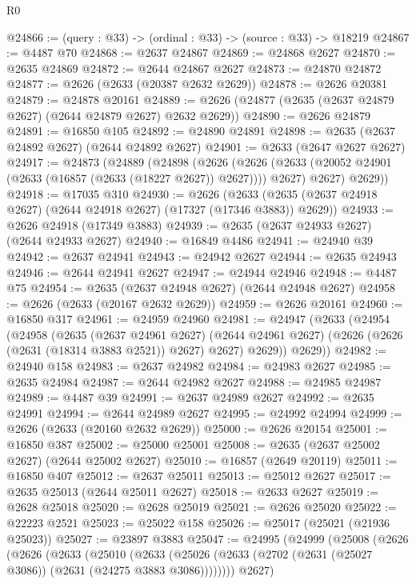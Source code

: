 \begin{lexlean}{R0}
\begin{coremodule}
@24866 := (query : @33) -> (ordinal : @33) -> (source : @33) -> @18219
@24867 := @4487 @70
@24868 := @2637 @24867
@24869 := @24868 @2627
@24870 := @2635 @24869
@24872 := @2644 @24867 @2627
@24873 := @24870 @24872
@24877 := @2626 (@2633 (@20387 @2632 @2629))
@24878 := @2626 @20381
@24879 := @24878 @20161
@24889 := @2626 (@24877 (@2635 (@2637 @24879 @2627) (@2644 @24879 @2627) @2632 @2629))
@24890 := @2626 @24879
@24891 := @16850 @105
@24892 := @24890 @24891
@24898 := @2635 (@2637 @24892 @2627) (@2644 @24892 @2627)
@24901 := @2633 (@2647 @2627 @2627)
@24917 := @24873
    (@24889
      (@24898
        (@2626
          (@2626 (@2633 (@20052 @24901 (@2633 (@16857 (@2633 (@18227 @2627)) @2627)))) @2627)
          @2627)
        @2629))
@24918 := @17035 @310
@24930 := @2626
    (@2633 (@2635 (@2637 @24918 @2627) (@2644 @24918 @2627) (@17327 (@17346 @3883)) @2629))
@24933 := @2626 @24918 (@17349 @3883)
@24939 := @2635 (@2637 @24933 @2627) (@2644 @24933 @2627)
@24940 := @16849 @4486
@24941 := @24940 @39
@24942 := @2637 @24941
@24943 := @24942 @2627
@24944 := @2635 @24943
@24946 := @2644 @24941 @2627
@24947 := @24944 @24946
@24948 := @4487 @75
@24954 := @2635 (@2637 @24948 @2627) (@2644 @24948 @2627)
@24958 := @2626 (@2633 (@20167 @2632 @2629))
@24959 := @2626 @20161
@24960 := @16850 @317
@24961 := @24959 @24960
@24981 := @24947
    (@2633
      (@24954
        (@24958
          (@2635
            (@2637 @24961 @2627)
            (@2644 @24961 @2627)
            (@2626 (@2626 (@2631 (@18314 @3883 @2521)) @2627) @2627)
            @2629))
        @2629))
@24982 := @24940 @158
@24983 := @2637 @24982
@24984 := @24983 @2627
@24985 := @2635 @24984
@24987 := @2644 @24982 @2627
@24988 := @24985 @24987
@24989 := @4487 @39
@24991 := @2637 @24989 @2627
@24992 := @2635 @24991
@24994 := @2644 @24989 @2627
@24995 := @24992 @24994
@24999 := @2626 (@2633 (@20160 @2632 @2629))
@25000 := @2626 @20154
@25001 := @16850 @387
@25002 := @25000 @25001
@25008 := @2635 (@2637 @25002 @2627) (@2644 @25002 @2627)
@25010 := @16857 (@2649 @20119)
@25011 := @16850 @407
@25012 := @2637 @25011
@25013 := @25012 @2627
@25017 := @2635 @25013 (@2644 @25011 @2627)
@25018 := @2633 @2627
@25019 := @2628 @25018
@25020 := @2628 @25019
@25021 := @2626 @25020
@25022 := @22223 @2521
@25023 := @25022 @158
@25026 := @25017 (@25021 (@21936 @25023))
@25027 := @23897 @3883
@25047 := @24995
    (@24999
      (@25008
        (@2626
          (@2626
            (@2633
              (@25010
                (@2633
                  (@25026 (@2633 (@2702 (@2631 (@25027 @3086)) (@2631 (@24275 @3883 @3086))))))))
            @2627)

\end{coremodule}
\end{lexlean}
